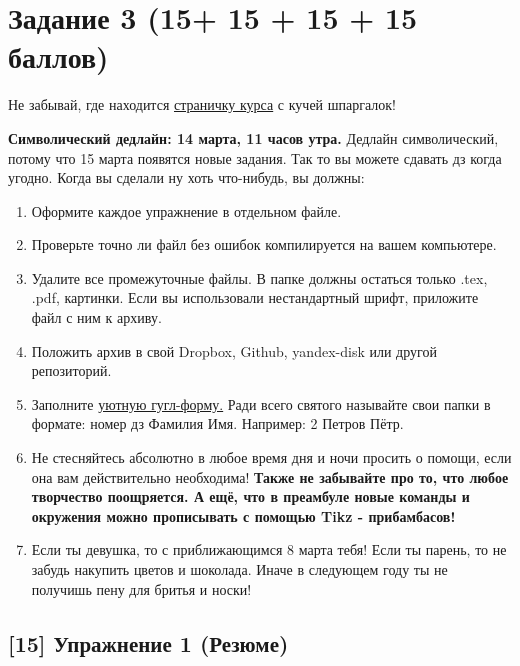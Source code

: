 \documentclass[12pt, a4paper, oneside]{article}
\begin{document}
\section*{Задание 3 (15+ 15 + 15 + 15 баллов)  }

Не забывай, где находится  \href{https://fulyankin.github.io/LaTeX/}{страничку курса} с кучей шпаргалок!

   \textbf{Символический дедлайн: 14 марта, 11 часов утра.}   Дедлайн символический, потому что 15 марта появятся новые задания. Так то вы можете сдавать дз когда угодно. Когда вы сделали ну хоть что-нибудь, вы должны: 

\begin{enumerate}
\item Оформите каждое упражнение в отдельном файле.
\item Проверьте точно ли файл без ошибок компилируется на вашем компьютере.
\item Удалите все промежуточные файлы. В папке должны остаться только .tex, .pdf, картинки. Если вы использовали нестандартный шрифт, приложите файл с ним к архиву.
\item Положить архив в	свой	Dropbox,	Github,	yandex-disk	или другой	репозиторий.
\item Заполните	\href{https://docs.google.com/forms/d/e/1FAIpQLSe11kxKVfv07iCL1E9yNX7ll9swKImiVwRr1H70lslGzInRSg/viewform}{уютную гугл-форму.} Ради всего святого называйте свои папки в формате: номер дз Фамилия Имя. Например: 2 Петров Пётр.
\item Не стесняйтесь абсолютно в любое время дня и ночи просить о помощи, если она вам действительно необходима! \textbf{Также не забывайте про то, что любое творчество поощряется. А ещё, что в преамбуле новые команды и окружения можно прописывать с помощью Tikz - прибамбасов! }
\item Если ты девушка, то с приближающимся 8 марта тебя! Если ты парень, то не забудь накупить цветов и шоколада. Иначе в следующем году ты не получишь пену для бритья и носки!
\end{enumerate}


\subsection*{[15]  Упражнение 1 (Резюме)}
\end{document}
